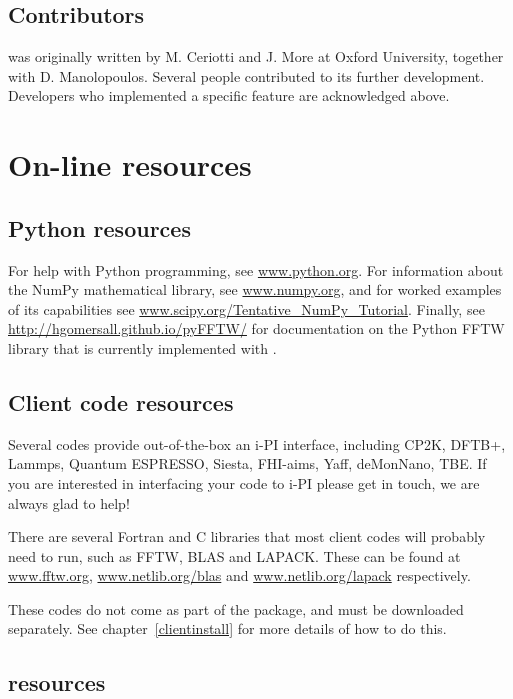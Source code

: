 \documentclass[11pt,english,fleqn]{report}
\begin{document}
\subsection{Contributors}

\ipi was originally written by M. Ceriotti and J. More at Oxford University,
together with D. Manolopoulos. Several people contributed to its further development. Developers who implemented a specific feature are acknowledged above.


\section{On-line resources}


\subsection{Python resources}

For help with Python programming, see \url{www.python.org}. For information
about the NumPy mathematical library, see \url{www.numpy.org}, and
for worked examples of its capabilities see \url{www.scipy.org/Tentative_NumPy_Tutorial}.
Finally, see \url{http://hgomersall.github.io/pyFFTW/} for documentation
on the Python FFTW library that is currently implemented with \ipi.


\subsection{Client code resources}

\label{librarywebsites}

Several codes provide out-of-the-box an i-PI interface, including CP2K, DFTB+, Lammps, Quantum ESPRESSO, Siesta, FHI-aims, Yaff, deMonNano, TBE. If you are interested in interfacing your code to i-PI please get in touch, we are always glad to help!

There are several Fortran and C libraries that most client codes will
probably need to run, such as FFTW, BLAS and LAPACK. These can be
found at \url{www.fftw.org}, \url{www.netlib.org/blas} and \url{www.netlib.org/lapack}
respectively.

These codes do not come as part of the \ipi package, and must be
downloaded separately. See chapter~\ref{clientinstall} for more details
of how to do this.


\subsection{\ipi resources}
\end{document}
